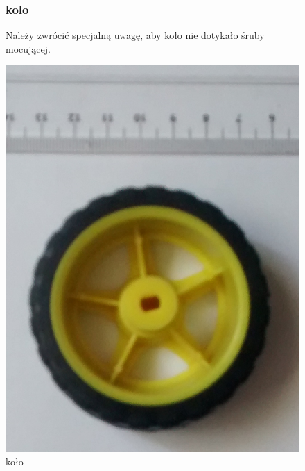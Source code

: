 \documentclass[a4paper,11pt]{article}
\def\SCALE{0.6}
\begin{document}
\begin{figure}[H]
	\subsubsection{kolo}
	Należy zwrócić specjalną uwagę, aby koło nie dotykało śruby mocującej.

	\centering
	\includegraphics[width=\SCALE
	\paperwidth]{kolo}
	\caption{koło}
\end{figure}
\end{document}

